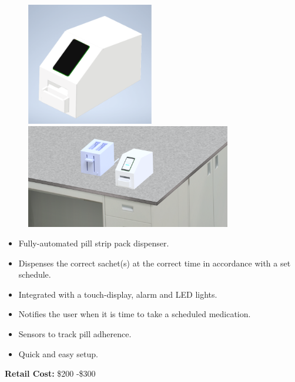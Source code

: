 \documentclass[12pt,titlepage]{article}
\begin{document}
{\selectfont
\begin{center}
\end{center}

\begin{figure}[h]
    \centering
    \includegraphics[width=0.495\textwidth]{./full.png}
    \includegraphics[width=0.8\textwidth]{./Full_Assembly.png}
    \label{fig:sidebyside}
\end{figure}

\begin{itemize}
    \item Fully-automated pill strip pack dispenser.
    \item Dispenses the correct sachet(s) at the correct time in accordance with a set schedule.
    \item Integrated with a touch-display, alarm and LED lights.
    \item Notifies the user when it is time to take a scheduled medication.
    \item Sensors to track pill adherence.
    \item Quick and easy setup.
    
\end{itemize}

\textbf{Retail Cost:} \$200 -\$300

}
\end{document}
